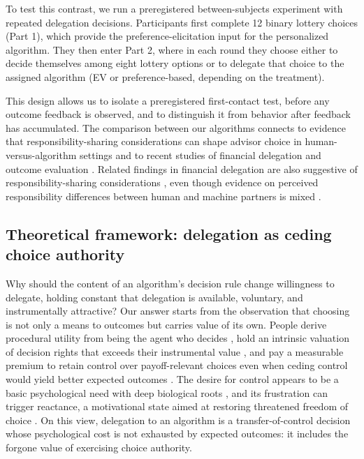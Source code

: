 \documentclass[a4paper, 12pt, fleqn]{article}
\theoremstyle{definition}
\begin{document}
To test this contrast, we run a preregistered between-subjects experiment with repeated delegation decisions. Participants first complete 12 binary lottery choices (Part 1), which provide the preference-elicitation input for the personalized algorithm. They then enter Part 2, where in each round they choose either to decide themselves among eight lottery options or to delegate that choice to the assigned algorithm (EV or preference-based, depending on the treatment). 

This design allows us to isolate a preregistered first-contact test, before any outcome feedback is observed, and to distinguish it from behavior after feedback has accumulated. 
The comparison between our algorithms connects to evidence that responsibility-sharing considerations can shape advisor choice in human-versus-algorithm settings \citep{Gazit2023} and to recent studies of financial delegation and outcome evaluation \citep{Ismagilova2025}. Related findings in financial delegation are also suggestive of responsibility-sharing considerations \citep{Werner2026}, even though evidence on perceived responsibility differences between human and machine partners is mixed \citep{Kirchkamp2019}.

\subsection*{Theoretical framework: delegation as ceding choice authority}
Why should the content of an algorithm's decision rule change willingness to delegate, holding constant that delegation is available, voluntary, and instrumentally attractive? Our answer starts from the observation that choosing is not only a means to outcomes but carries value of its own. People derive procedural utility from being the agent who decides \citep{FreyBenzStutzer2004}, 
hold an intrinsic valuation of decision rights that exceeds their instrumental value \citep{Bartling2014}, and pay a measurable premium to retain control over payoff-relevant choices even when ceding control would yield better expected outcomes \citep{Owens2014}. The desire for control appears to be a basic psychological need with deep biological roots \citep{Leotti2010}, and its frustration can trigger reactance, a motivational state aimed at restoring threatened freedom of choice \citep{Brehm1966}. On this view, delegation to an algorithm is a transfer-of-control decision \citep{Candrian2022} whose psychological cost is not exhausted by expected outcomes: it includes the forgone value of exercising choice authority.
\end{document}
